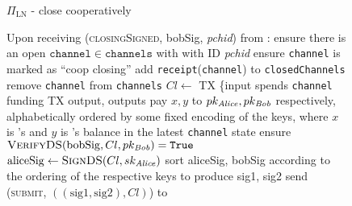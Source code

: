 \begin{figure}[H]
\begin{protocolbox}{$\Pi_{\mathrm{LN}}$ - close cooperatively}
\begin{algorithmic}[1]
        \State Upon receiving (\textsc{closingSigned}, bobSig, \textit{pchid}) from
        \bob:
        \Indent
          \State ensure there is an open $\mathtt{channel} \in
          \mathtt{channels}$ with \bob with ID \textit{pchid}
          \label{alg:protocol:close:coop:signed:ensure:exists}
          \State ensure \texttt{channel} is marked as ``coop closing''
          \label{alg:protocol:close:coop:signed:ensure:marked}
          \State add \texttt{receipt}(\texttt{channel}) to
          \texttt{closedChannels}
          \label{alg:protocol:close:coop:report}
          \State remove \texttt{channel} from \texttt{channels}
          \State $Cl \gets$ TX \{input spends \texttt{channel} funding TX
          output, outputs pay $x, y$ to $pk_{\mathit{Alice}}, pk_{\mathit{Bob}}$ respectively,
          alphabetically ordered by some fixed encoding of the keys, where $x$
          is \alice's and $y$ is \bob's balance in the latest \texttt{channel}
          state
          \State ensure $\textsc{VerifyDS}(\mathrm{bobSig}, Cl, pk_{\mathit{Bob}}) =
          \mathtt{True}$
          \label{alg:protocol:close:coop:signed:ensure:sig}
          \State $\mathrm{aliceSig} \gets \textsc{SignDS}(Cl, sk_{\mathit{Alice}})$
          \State sort aliceSig, bobSig according to the ordering of the
          respective keys to produce sig1, sig2
          \State send (\textsc{submit}, $\left((\mathrm{sig1}, \mathrm{sig2}),
          Cl\right)$) to \ledger
        \EndIndent
      \end{algorithmic}
    \end{protocolbox}
    \caption{}
    \label{alg:protocol:close:coop}
  \end{figure}
